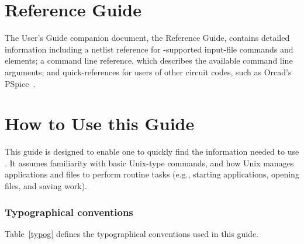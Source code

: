 \section{Reference Guide}
\label{Reference_Guide}
The \Xyce{} User's Guide companion document, the \Xyce{} Reference Guide\ReferenceGuide{},
contains detailed information including a
netlist reference for \Xyce{}-supported input-file commands and elements; a command line reference, which describes the available command line arguments; and quick-references for 
users of other circuit codes, such as Orcad's PSpice~\cite{PSpiceUG:1998}.

\section{How to Use this Guide}
\label{HowTo_Guide}

This guide is designed to enable one to quickly find the information needed to use \Xyce{}.  It assumes familiarity with basic  Unix-type commands, and how Unix manages applications and files to perform routine tasks (e.g., starting applications, opening files, and saving work).

\subsubsection{Typographical conventions}
Table~\ref{typog} defines the typographical conventions used in this guide.

